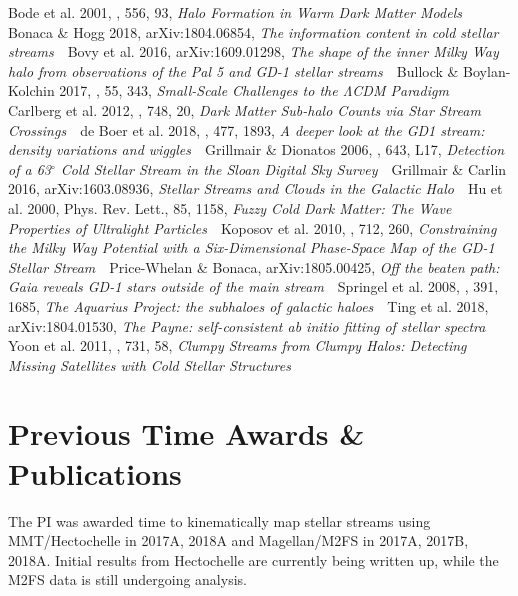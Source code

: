 \documentclass[12pt]{article}
\begin{document}
{Bode et al. 2001, \apj, 556, 93, \emph{Halo Formation in Warm Dark Matter Models} \,\textbullet\,
Bonaca \& Hogg 2018, arXiv:1804.06854, \emph{The information content in cold stellar streams} \,\textbullet\,
Bovy et al. 2016, arXiv:1609.01298, \emph{The shape of the inner Milky Way halo from observations of the Pal 5 and GD-1 stellar streams} \,\textbullet\,
Bullock \& Boylan-Kolchin 2017, \araa, 55, 343, \emph{Small-Scale Challenges to the ΛCDM Paradigm} \,\textbullet\,
Carlberg et al. 2012, \apj, 748, 20, \emph{Dark Matter Sub-halo Counts via Star Stream Crossings} \,\textbullet\,
de Boer et al. 2018, \mnras, 477, 1893, \emph{A deeper look at the GD1 stream: density variations and wiggles} \,\textbullet\,
Grillmair \& Dionatos 2006, \apj, 643, L17, \emph{Detection of a 63$^\circ$ Cold Stellar Stream in the Sloan Digital Sky Survey} \,\textbullet\,
Grillmair \& Carlin 2016, arXiv:1603.08936, \emph{Stellar Streams and Clouds in the Galactic Halo} \,\textbullet\,
Hu et al. 2000, Phys. Rev. Lett., 85, 1158, \emph{Fuzzy Cold Dark Matter: The Wave Properties of Ultralight Particles} \,\textbullet\,
Koposov et al. 2010, \apj, 712, 260, \emph{Constraining the Milky Way Potential with a Six-Dimensional Phase-Space Map of the GD-1 Stellar Stream} \,\textbullet\,
Price-Whelan \& Bonaca, arXiv:1805.00425, \emph{Off the beaten path: Gaia reveals GD-1 stars outside of the main stream} \,\textbullet\,
Springel et al. 2008, \mnras, 391, 1685, \emph{The Aquarius Project: the subhaloes of galactic haloes} \,\textbullet\,
Ting et al. 2018, arXiv:1804.01530, \emph{The Payne: self-consistent ab initio fitting of stellar spectra} \,\textbullet\,
Yoon et al. 2011, \apj, 731, 58, \emph{Clumpy Streams from Clumpy Halos: Detecting Missing Satellites with Cold Stellar Structures}
}

\section*{Previous Time Awards \& Publications}\vskip-0.2in

The PI was awarded time to kinematically map stellar streams using MMT/Hectochelle in 2017A, 2018A and Magellan/M2FS in 2017A, 2017B, 2018A.
Initial results from Hectochelle are currently being written up, while the M2FS data is still undergoing analysis.

\end{document}
